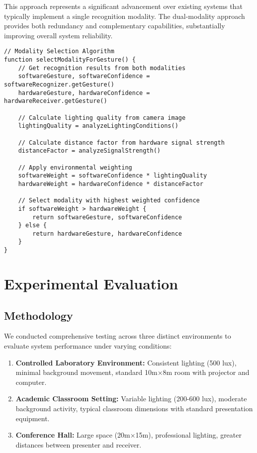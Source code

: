 \documentclass[arxiv,usenatbib]{iupartex}
\begin{document}
This approach represents a significant advancement over existing systems that typically implement a single recognition modality. The dual-modality approach provides both redundancy and complementary capabilities, substantially improving overall system reliability.

\begin{lstlisting}[style=codestyle]
// Modality Selection Algorithm
function selectModalityForGesture() {
    // Get recognition results from both modalities
    softwareGesture, softwareConfidence = softwareRecognizer.getGesture()
    hardwareGesture, hardwareConfidence = hardwareReceiver.getGesture()
    
    // Calculate lighting quality from camera image
    lightingQuality = analyzeLightingConditions()
    
    // Calculate distance factor from hardware signal strength
    distanceFactor = analyzeSignalStrength()
    
    // Apply environmental weighting
    softwareWeight = softwareConfidence * lightingQuality
    hardwareWeight = hardwareConfidence * distanceFactor
    
    // Select modality with highest weighted confidence
    if softwareWeight > hardwareWeight {
        return softwareGesture, softwareConfidence
    } else {
        return hardwareGesture, hardwareConfidence
    }
}
\end{lstlisting}

\section{Experimental Evaluation}
\subsection{Methodology}
We conducted comprehensive testing across three distinct environments to evaluate system performance under varying conditions:

\begin{enumerate}
  \item \textbf{Controlled Laboratory Environment:} Consistent lighting (500 lux), minimal background movement, standard 10m×8m room with projector and computer.
  
  \item \textbf{Academic Classroom Setting:} Variable lighting (200-600 lux), moderate background activity, typical classroom dimensions with standard presentation equipment.
  
  \item \textbf{Conference Hall:} Large space (20m×15m), professional lighting, greater distances between presenter and receiver.
\end{enumerate}
\end{document}
